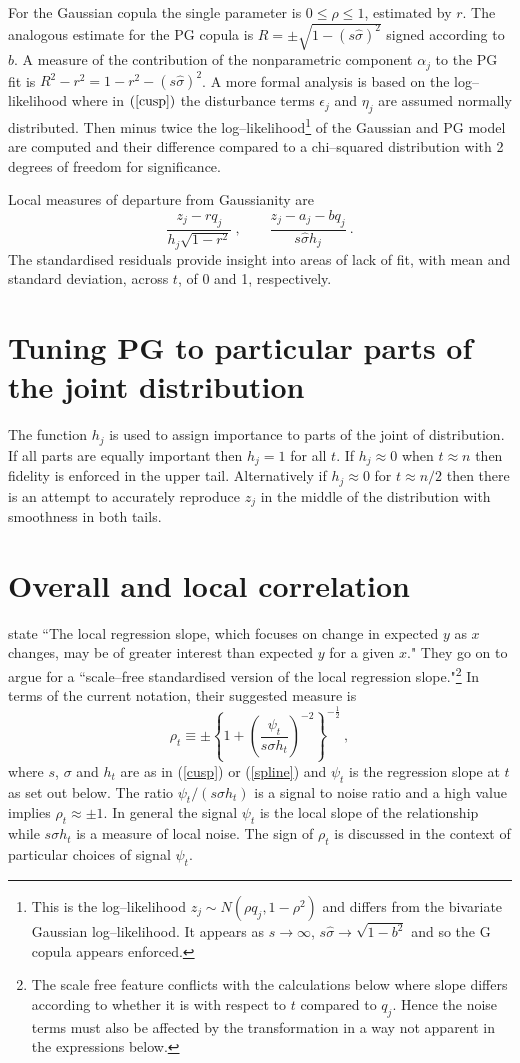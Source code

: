 \documentclass[authoryear]{elsarticle}
\newcommand{\eps}{\epsilon}
\newcommand{\eref}[1]{(\ref{#1})}
\newcommand{\cq}{\ , \qquad}
\newcommand{\be}[1]{\begin{equation}\label{#1}}
\newcommand{\ee}{\end{equation}}
\begin{document}
For the Gaussian copula the single parameter is $0\le\rho\le 1$, estimated by  $r$.   The analogous estimate for the PG copula is $R=\pm\sqrt{1-(s\hat\sigma)^2}$ signed according to $b$.   A measure of the  contribution of the nonparametric component $\alpha_j$  to the PG fit is  
$
R^2-r^2 = 1-r^2 - (s\hat\sigma)^2
$.
A more formal analysis is based on the log--likelihood where in $\eref{cusp}$ the disturbance terms $\eps_j$ and $\eta_j$ are assumed normally distributed.    Then  minus twice the log--likelihood\footnote{This is the log--likelihood $z_j\sim N(\rho q_j,1-\rho^2)$ and differs from the bivariate Gaussian log--likelihood.  It appears  as  $s\rightarrow\infty$, $s\hat\sigma\rightarrow\sqrt{ 1-b^2}$ and so the G copula appears enforced.}  of the Gaussian and  PG model  are computed and their difference compared to a chi--squared distribution with 2 degrees of freedom for significance.

Local  measures of departure from Gaussianity are 
\be{lr}
\frac{z_j-r q_j}{h_j\sqrt{1-r^2}}\cq \frac{z_j-a_j-bq_j}{ s\hat\sigma h_j}\ .
\ee
The  standardised residuals
provide insight into areas of lack of fit, with mean and standard deviation, across $t$,  of 0 and 1, respectively.

\section{Tuning PG to particular parts of the joint distribution}
The function $h_j$ is used to assign  importance to parts of the joint of distribution.  If all parts are equally important then $h_j=1$ for all $t$.   If $h_j\approx 0$ when $t\approx n$ then fidelity  is enforced in the upper tail.  Alternatively if $h_j\approx 0$ for $t\approx n/2$ then there is an attempt to accurately reproduce $z_j$ in the middle of the distribution with smoothness  in both tails.
\section{Overall and local correlation}

\cite{bjerve1993correlation} state ``The local regression slope, which focuses on change in expected $y$ as $x$ changes, may be of greater interest than expected  $y$ for a given $x$." They go on to argue for  a  ``scale--free standardised version of the local regression slope."\footnote{The scale free feature conflicts with the calculations below where  slope differs according to whether it is with respect to $t$ compared to $q_j$.  Hence the noise terms must also be affected by the transformation in a way not apparent in the expressions below.} In terms of the current notation, their suggested measure is 
\be{rhot}
 \rho_t\equiv\pm\left\{1+\left(\frac{\psi_t}{s\sigma h_t}\right)^{-2}\right\}^{-\frac{1}{2}}\ ,
\ee
where $s$, $\sigma$ and $h_t$ are as in \eref{cusp} or \eref{spline} and $\psi_t$ is the regression slope at $t$ as set out below.  The ratio $\psi_t/(s\sigma h_t)$ is a signal to noise ratio and a high value implies $\rho_t\approx \pm 1$.    In general the signal  $\psi_t$ is the local slope of the relationship while $s\sigma h_t$ is a measure of local noise.   The sign of $\rho_t$ is discussed in the context of particular choices of signal $\psi_t$.  
\end{document}
